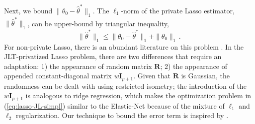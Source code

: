 \documentclass[11pt]{article}
\newcommand{\bI}{\boldsymbol{I}}
\newcommand{\bR}{\boldsymbol{R}}
\newcommand{\hth}{\widehat{\theta}}
\begin{document}
Next, we bound $\|\theta_0-\hth^*\|_1$. The $\ell_1$-norm of the private Lasso estimator, $\|\hth^*\|_1$, can be upper-bound by triangular inequality,
\[
\|\hth^*\|_1\leq\|\theta_0-\hth^*\|_1+\|\theta_0\|_1\,.
\]
For non-private Lasso, there is an abundant literature on this problem \citep{BulmannvandeGeer11}. In the JLT-privatized Lasso problem, there are two differences that require an adaptation: 1) the appearance of random matrix $\bR$; 2) the appearance of appended constant-diagonal matrix $w\bI_{p+1}$. Given that $\bR$ is Gaussian, the randomness can be dealt with using restricted isometry; the introduction of the $w\bI_{p+1}$ is analogous to ridge regression, which makes the optimization problem in (\ref{eq:lasso-JL-simpl}) similar to the Elastic-Net \citep{elasticnet-zou-hastie} because of the mixture of $\ell_1$ and $\ell_2$ regularization. Our technique to bound the error term is inspired by \citep{HvdG11}. 
\end{document}
